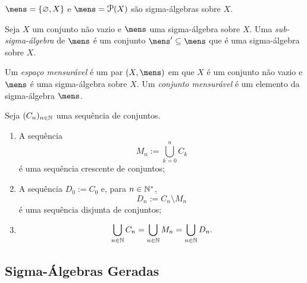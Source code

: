 \begin{ex}
	$\mens = \{\emptyset,X\}$ e $\mens = \p(X)$ são sigma-álgebras sobre $X$.
\end{ex}

\begin{defi}
Seja $X$ um conjunto não vazio e $\mens$ uma sigma-álgebra sobre $X$. Uma \emph{sub-sigma-álgebra} de $\mens$ é um conjunto $\mens' \subseteq \mens$ que é uma sigma-álgebra sobre $X$.
\end{defi}

\begin{defi}
	Um \emph{espaço mensurável} é um par $(X,\mens)$ em que $X$ é um conjunto não vazio e $\mens$ é uma sigma-álgebra sobre $X$. Um \emph{conjunto mensurável} é um elemento da sigma-álgebra $\mens$.
\end{defi}

\begin{prop}
Seja $(C_n)_{n \in \mathbb{N}}$ uma sequência de conjuntos.
	\begin{enumerate}
	\item A sequência
	\begin{equation*}
	M_n := \bigcup_{k=0}^n C_k
	\end{equation*}
é uma sequência crescente de conjuntos;
	\item A sequência $D_0 := C_0$ e, para $n \in \mathbb{N}^*$,
	\begin{equation*}
	D_n := C_n \setminus M_n
	\end{equation*}
é uma sequência disjunta de conjuntos;
	\item	
	\begin{equation*}
	\bigcup_{n \in \mathbb{N}} C_n = \bigcup_{n \in \mathbb{N}} M_n = \bigcup_{n \in \mathbb{N}} D_n.
	\end{equation*}
	\end{enumerate}
\end{prop}

\subsection{Sigma-Álgebras Geradas}

